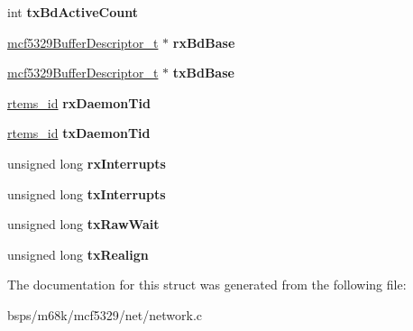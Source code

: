 \begin{DoxyCompactItemize}
int {\bfseries tx\+Bd\+Active\+Count}
\item 
\mbox{\label{structmcf5329__enet__struct_a8a069198926db3f99fd4e347c7844b97}} 
\mbox{\hyperlink{structmcf5329BufferDescriptor__}{mcf5329\+Buffer\+Descriptor\+\_\+t}} $\ast$ {\bfseries rx\+Bd\+Base}
\item 
\mbox{\label{structmcf5329__enet__struct_ac317288c5a52574445bf820c9643c321}} 
\mbox{\hyperlink{structmcf5329BufferDescriptor__}{mcf5329\+Buffer\+Descriptor\+\_\+t}} $\ast$ {\bfseries tx\+Bd\+Base}
\item 
\mbox{\label{structmcf5329__enet__struct_a80df9931652eba5e39e59abd057d8553}} 
\mbox{\hyperlink{group__ClassicTasks_gab20892b814dced7dd4e5b9bf42becd57}{rtems\+\_\+id}} {\bfseries rx\+Daemon\+Tid}
\item 
\mbox{\label{structmcf5329__enet__struct_a8adfd0abe9a024456e6d6df722586ae0}} 
\mbox{\hyperlink{group__ClassicTasks_gab20892b814dced7dd4e5b9bf42becd57}{rtems\+\_\+id}} {\bfseries tx\+Daemon\+Tid}
\item 
\mbox{\label{structmcf5329__enet__struct_aeb846820d447d28bfd6362acacd3f01e}} 
unsigned long {\bfseries rx\+Interrupts}
\item 
\mbox{\label{structmcf5329__enet__struct_ae95f654edd081b29182d8d4398f3c7ed}} 
unsigned long {\bfseries tx\+Interrupts}
\item 
\mbox{\label{structmcf5329__enet__struct_aca76adb1372ba26fcb70703d41da0e45}} 
unsigned long {\bfseries tx\+Raw\+Wait}
\item 
\mbox{\label{structmcf5329__enet__struct_a8f6e011de9e72fce8933a42bbbf364fd}} 
unsigned long {\bfseries tx\+Realign}
\end{DoxyCompactItemize}


The documentation for this struct was generated from the following file\+:\begin{DoxyCompactItemize}
\item 
bsps/m68k/mcf5329/net/network.\+c\end{DoxyCompactItemize}
